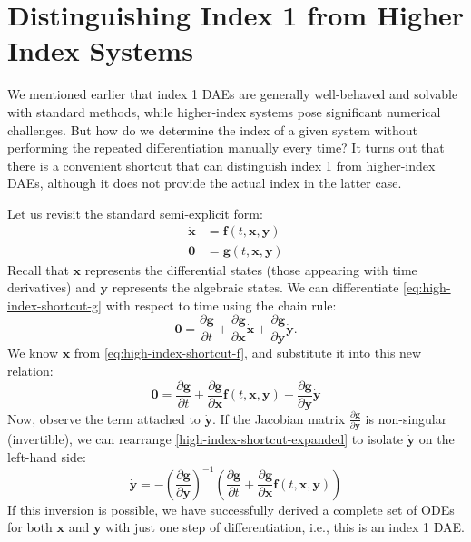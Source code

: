 \section{Distinguishing Index 1 from Higher Index Systems}

We mentioned earlier that index 1 DAEs are generally well-behaved and solvable with standard methods, while higher-index systems pose significant numerical challenges. But how do we determine the index of a given system without performing the repeated differentiation manually every time? It turns out that there is a convenient shortcut that can distinguish index 1 from higher-index DAEs, although it does not provide the actual index in the latter case. 

Let us revisit the standard semi-explicit form:
\begin{align}
    \dot{\mathbf{x}} &= \mathbf{f}(t, \mathbf{x}, \mathbf{y}) \label{eq:high-index-shortcut-f}\\
    \mathbf{0} &= \mathbf{g}(t, \mathbf{x}, \mathbf{y}) \label{eq:high-index-shortcut-g}
\end{align}
Recall that $\mathbf{x}$ represents the differential states (those appearing with time derivatives) and $\mathbf{y}$ represents the algebraic states. We can differentiate \autoref{eq:high-index-shortcut-g} with respect to time using the chain rule:
\begin{equation}
    \mathbf{0} = \frac{\partial \mathbf{g}}{\partial t} + \frac{\partial \mathbf{g}}{\partial \mathbf{x}}\dot{\mathbf{x}} + \frac{\partial \mathbf{g}}{\partial \mathbf{y}}\dot{\mathbf{y}}.
\end{equation}
We know $\dot{\mathbf{x}}$ from \autoref{eq:high-index-shortcut-f}, and substitute it into this new relation:
\begin{equation}
    \mathbf{0} = \frac{\partial \mathbf{g}}{\partial t} + \frac{\partial \mathbf{g}}{\partial \mathbf{x}}\mathbf{f}(t, \mathbf{x}, \mathbf{y}) + \frac{\partial \mathbf{g}}{\partial \mathbf{y}}\dot{\mathbf{y}}
    \label{high-index-shortcut-expanded}
\end{equation}
Now, observe the term attached to $\dot{\mathbf{y}}$. If the Jacobian matrix $\frac{\partial \mathbf{g}}{\partial \mathbf{y}}$ is non-singular (invertible), we can rearrange \autoref{high-index-shortcut-expanded} to isolate $\dot{\mathbf{y}}$ on the left-hand side:
\begin{equation}
    \dot{\mathbf{y}} = -\left( \frac{\partial \mathbf{g}}{\partial \mathbf{y}} \right)^{-1} \left( \frac{\partial \mathbf{g}}{\partial t} + \frac{\partial \mathbf{g}}{\partial \mathbf{x}}\mathbf{f}(t, \mathbf{x}, \mathbf{y}) \right)
\end{equation}
If this inversion is possible, we have successfully derived a complete set of ODEs for both $\mathbf{x}$ and $\mathbf{y}$ with just one step of differentiation, i.e., this is an index 1 DAE. 

